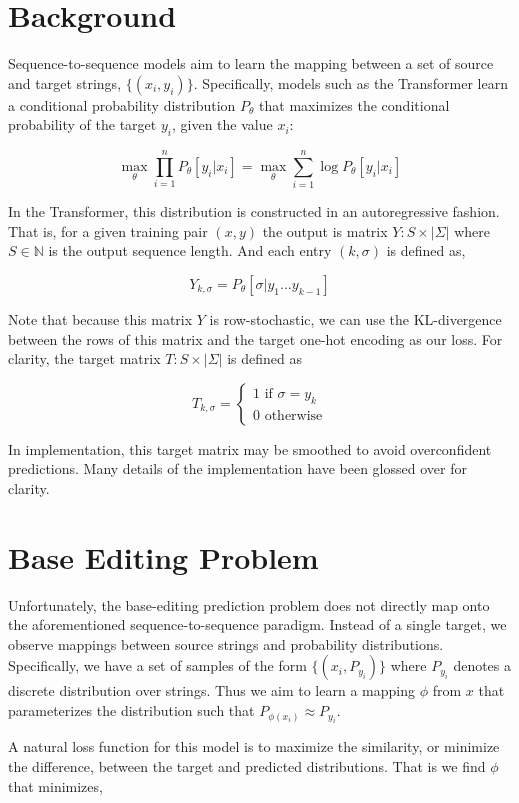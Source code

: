 \documentclass[12pt]{article}
\begin{document}
\section*{Background}
Sequence-to-sequence models aim to learn the mapping between a set of
source and target strings, $\{(x_i, y_i)\}$. Specifically, models such
as the Transformer learn a conditional probability distribution
$P_\theta$ that maximizes the conditional probability of the target
$y_i$, given the value $x_i$:

$$\max_{\theta} \prod_{i=1}^n{P_\theta[y_i | x_i]} = \max_{\theta}\sum_{i=1}^n{\log{P_\theta[y_i | x_i]}}$$

In the Transformer, this distribution is constructed in an
autoregressive fashion. That is, for a given training pair $(x, y)$
the output is matrix $Y : S \times |\Sigma|$ where $S \in \mathbb{N}$
is the output sequence length. And each entry $(k, \sigma)$ is defined
as,

$$Y_{k,\sigma} = P_\theta[\sigma | y_1\ldots y_{k-1}]$$

Note that because this matrix $Y$ is row-stochastic, we can use the
KL-divergence between the rows of this matrix and the target one-hot
encoding as our loss. For clarity, the target matrix
$T : S \times |\Sigma|$ is defined as

$$T_{k, \sigma} =
  \begin{cases}
    1 \text{ if } \sigma = y_k\\
    0 \text{ otherwise}
  \end{cases}
$$

In implementation, this target matrix may be smoothed to avoid
overconfident predictions. Many details of the implementation have
been glossed over for clarity.

\section*{Base Editing Problem}
Unfortunately, the base-editing prediction problem does not directly
map onto the aforementioned sequence-to-sequence paradigm. Instead of
a single target, we observe mappings between source strings and
probability distributions. Specifically, we have a set of samples of
the form $\{(x_i,P_{y_i})\}$ where $P_{y_i}$ denotes a discrete
distribution over strings. Thus we aim to learn a mapping $\phi$ from
$x$ that parameterizes the distribution such that
$P_{\phi(x_i)} \approx P_{y_i}$.

A natural loss function for this model is to maximize the similarity,
or minimize the difference, between the target and predicted
distributions. That is we find $\phi$ that minimizes,
\end{document}
